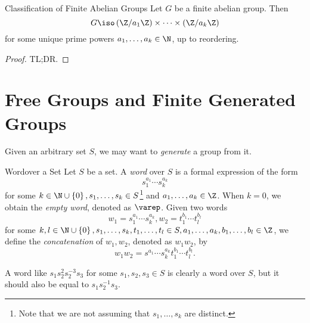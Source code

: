 \documentclass[pmath347]{subfiles}
\begin{document}
    \begin{theorem}{Classification of Finite Abelian Groups}
        Let $G$ be a finite abelian group. Then
        \begin{equation*}
            G\iso \left( \Z /a_1\Z \right) \times\cdots\times \left( \Z /a_k\Z \right) 
        \end{equation*}
        for some unique prime powers $a_1,\ldots,a_k\in\N$, up to reordering.
    \end{theorem}

    \begin{proof}
        TL;DR.
    \end{proof}

    \section{Free Groups and Finite Generated Groups}

    Given an arbitrary set $S$, we may want to \textit{generate} a group from it.

    \begin{definition}{Word}{over a Set}
        Let $S$ be a set. A \emph{word} over $S$ is a formal expression of the form
        \begin{equation*}
            s_1^{a_1}\cdots s_k^{a_k}
        \end{equation*}
        for some $k\in\N\cup\left\lbrace 0 \right\rbrace, s_1,\ldots,s_k\in S$\footnote{Note that we are not assuming that $s_1,\ldots,s_k$ are distinct.} and $a_1,\ldots,a_k\in\Z$. When $k=0$, we obtain the \emph{empty word}, denoted as $\varep$. Given two words
        \begin{equation*}
            w_1 = s_1^{a_1}\cdots s_k^{a_k}, w_2 = t_1^{b_1}\cdots t_l^{b_l}
        \end{equation*}
        for some $k,l\in\N\cup\left\lbrace 0 \right\rbrace, s_1,\ldots,s_k,t_1,\ldots,t_l\in S, a_1,\ldots,a_k,b_1,\ldots,b_l\in\Z$, we define the \emph{concatenation} of $w_1, w_2$, denoted as $w_1w_2$, by
        \begin{equation*}
            w_1w_2 = s^{a_1}\cdots s_k^{a_k}t_1^{b_1}\cdots t_l^{b_l}.
        \end{equation*}
    \end{definition}
    
    \noindent A word like $s_1s_2^{2} s_2^{-3}s_3$ for some $s_1,s_2,s_3\in S$ is clearly a word over $S$, but it should also be equal to $s_1s_2^{-1} s_3$.
\end{document}
